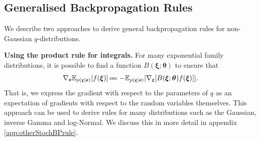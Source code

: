 \documentclass{article}
\newcommand{\E}{\mathbb{E}} %
\newcommand{\myvecsym}[1]{\mbox{$\boldsymbol{#1}$}}
\newcommand{\vtheta}{\mbox{$\myvecsym{\theta}$}}
\newcommand{\vxi}{\mbox{$\myvecsym{\xi}$}}
\begin{document}
\begin{bibunit}[icml2013]
\subsection{Generalised Backpropagation Rules}
\label{sect:stochBP_genRules}
We describe two approaches to derive general backpropagation rules for non-Gaussian $q$-distributions.

\textbf{Using the product rule for integrals.}
For many exponential family distributions, it is possible to find a function 
$B(\vxi; \vtheta)$ to ensure that
\vspace{-2mm}
\begin{align}
\nabla_{\tiny{\vtheta}} \E_{\tiny{p(\vxi | \vtheta )}} [f(\vxi)] \!=\!\! =  -\E_{\tiny{p (\vxi | 
\vtheta )}} [\nabla_{\tiny{\vxi}} [B (\vxi; \vtheta) f (\vxi)]].  \nonumber
\end{align}
That is, we express the gradient with respect to the parameters of $q$ as an 
expectation of gradients with respect to the random variables themselves.
This approach can be used to derive rules for many 
distributions such as the Gaussian, inverse Gamma and log-Normal. 
We discuss this in more detail in appendix
\ref{app:otherStochBPrule}. 


\end{bibunit}
\end{document}
